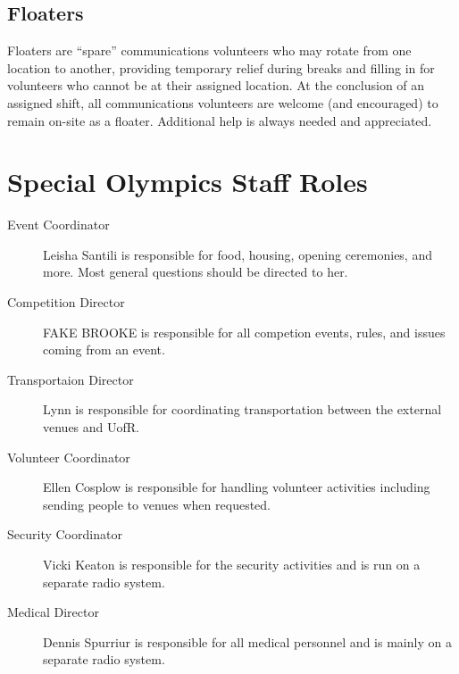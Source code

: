 \documentclass[pdflatex,letterpaper,twoside,12pt]{book}
\begin{document}
\section{Floaters}

Floaters are ``spare'' communications volunteers who may rotate from one location to another, providing temporary relief during breaks and filling in for volunteers who cannot be at their assigned location.  At the conclusion of an assigned shift, all communications volunteers are welcome (and encouraged) to remain on-site as a floater.  Additional help is always needed and appreciated.


\chapter{Special Olympics Staff Roles}

\begin{description}
  \item[Event Coordinator] Leisha Santili is responsible for food, housing, opening ceremonies, and more.  Most general questions should be directed to her.
  \item[Competition Director] FAKE BROOKE is responsible for all competion events, rules, and issues coming from an event.
  \item[Transportaion Director] Lynn is responsible for coordinating transportation between the external venues and UofR.
  \item[Volunteer Coordinator] Ellen Cosplow is responsible for handling volunteer activities including sending people to venues when requested.
  \item[Security Coordinator] Vicki Keaton is responsible for the security activities and is run on a separate radio system.
  \item[Medical Director] Dennis Spurriur is responsible for all medical personnel and is mainly on a separate radio system.
\end{description}

\end{document}
